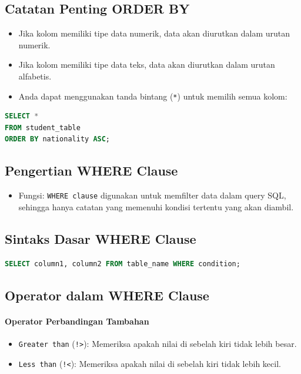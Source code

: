 \documentclass{article}
\begin{document}
\subsection{Catatan Penting ORDER BY}
\begin{itemize}
    \item Jika kolom memiliki tipe data numerik, data akan diurutkan dalam urutan numerik.
    \item Jika kolom memiliki tipe data teks, data akan diurutkan dalam urutan alfabetis.
    \item Anda dapat menggunakan tanda bintang (\texttt{*}) untuk memilih semua kolom:
\end{itemize}
\begin{lstlisting}[language=SQL, caption={ORDER BY dengan Tanda Bintang}, captionpos=b]
SELECT *
FROM student_table 
ORDER BY nationality ASC;
\end{lstlisting}

\subsection{Pengertian WHERE Clause}
\begin{itemize}
    \item Fungsi: \texttt{WHERE clause} digunakan untuk memfilter data dalam query SQL, sehingga hanya catatan yang memenuhi kondisi tertentu yang akan diambil.
\end{itemize}

\subsection{Sintaks Dasar WHERE Clause}
\begin{lstlisting}[language=SQL, caption={Sintaks Dasar WHERE}, captionpos=b]
SELECT column1, column2 FROM table_name WHERE condition;
\end{lstlisting}

\subsection{Operator dalam WHERE Clause}
\paragraph{Operator Perbandingan Tambahan}
\begin{itemize}
    \item \texttt{Greater than} (\texttt{!>}): Memeriksa apakah nilai di sebelah kiri tidak lebih besar.
    \item \texttt{Less than} (\texttt{!<}): Memeriksa apakah nilai di sebelah kiri tidak lebih kecil.
\end{itemize}
\end{document}
